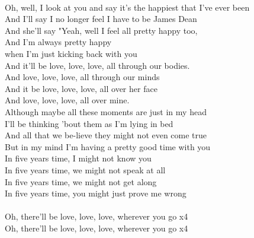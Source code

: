                               \\
Oh, well, I  look at you and  say it's the happiest that  I've ever  been\\
And I'll say  I no longer  feel I have to  be James  Dean\\
And she'll say  "Yeah, well I  feel all  pretty happy  too,\\
And I'm  always pretty  happy\\
when I'm just  kicking back with  you\\
And it'll be  love, love,  love,  all through our  bodies.\\
And  love, love,  love,  all through our  minds\\
And it be  love, love,  love,  all over her  face\\
And  love, love,  love,  all over  mine.\\
Although  maybe all these  moments are  just in my  head\\
I'll be  thinking 'bout  them as I'm  lying in  bed\\
And  all that we be-lieve they might not  even come  true\\
But in my  mind I'm  having a pretty good  time with  you\\
In  five years  time,  I might not  know you\\
In  five years  time,  we might not  speak at all\\
In  five years  time,  we might not  get along\\
In  five years  time,  you might just  prove me  wrong\\
                              \\
Oh, there'll be  love, love,  love,  wherever  you go  x4\\
Oh, there'll be  love, love,  love,  wherever  you go  x4\\
